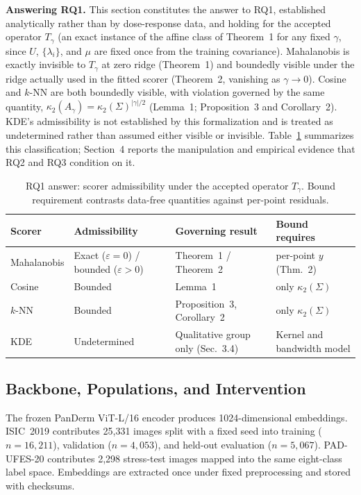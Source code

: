\documentclass[11pt,a4paper]{article}
\begin{document}
\textbf{Answering RQ1.} This section constitutes the answer to RQ1, established analytically rather than by dose-response data, and holding for the accepted operator $T_\gamma$ (an exact instance of the affine class of Theorem~1 for any fixed $\gamma$, since $U$, $\{\lambda_i\}$, and $\mu$ are fixed once from the training covariance). Mahalanobis is exactly invisible to $T_\gamma$ at zero ridge (Theorem~1) and boundedly visible under the ridge actually used in the fitted scorer (Theorem~2, vanishing as $\gamma\to0$). Cosine and $k$-NN are both boundedly visible, with violation governed by the same quantity, $\kappa_2(A_\gamma)=\kappa_2(\Sigma)^{|\gamma|/2}$ (Lemma~1; Proposition~3 and Corollary~2). KDE's admissibility is not established by this formalization and is treated as undetermined rather than assumed either visible or invisible. Table~\ref{tab:rq1-admissibility} summarizes this classification; Section~4 reports the manipulation and empirical evidence that RQ2 and RQ3 condition on it.

\begin{table}[t]
\centering
\caption{RQ1 answer: scorer admissibility under the accepted operator $T_\gamma$. Bound requirement contrasts data-free quantities against per-point residuals.}
\label{tab:rq1-admissibility}
\small
\begin{tabular}{p{2.0cm}p{3.2cm}p{3.4cm}p{3.4cm}}
\toprule
Scorer & Admissibility & Governing result & Bound requires\\
\midrule
Mahalanobis & Exact ($\varepsilon=0$) / bounded ($\varepsilon>0$) & Theorem~1 / Theorem~2 & per-point $y$ (Thm.~2)\\
Cosine & Bounded & Lemma~1 & only $\kappa_2(\Sigma)$\\
$k$-NN & Bounded & Proposition~3, Corollary~2 & only $\kappa_2(\Sigma)$\\
KDE & Undetermined & Qualitative group only (Sec.~3.4) & Kernel and bandwidth model\\
\bottomrule
\end{tabular}
\end{table}

\subsection{Backbone, Populations, and Intervention}
The frozen PanDerm ViT-L/16 encoder produces 1024-dimensional embeddings. ISIC~2019 contributes 25,331 images split with a fixed seed into training ($n=16{,}211$), validation ($n=4{,}053$), and held-out evaluation ($n=5{,}067$). PAD-UFES-20 contributes 2,298 stress-test images mapped into the same eight-class label space. Embeddings are extracted once under fixed preprocessing and stored with checksums.
\end{document}

